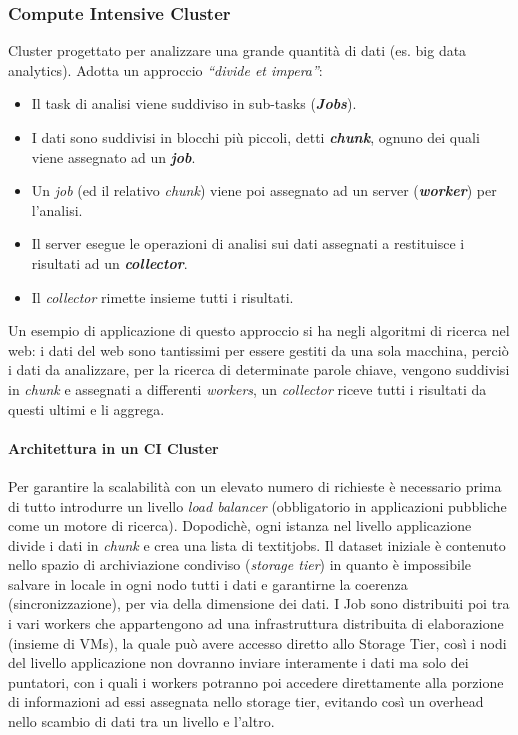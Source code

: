 \documentclass{article}
\begin{document}
\subsubsection{Compute Intensive Cluster}
Cluster progettato per analizzare una grande quantità di dati (es. big data analytics). 
Adotta un approccio \textit{“divide et impera”}:
\begin{itemize}
    \item Il task di analisi viene suddiviso in sub-tasks (\textit{\textbf{Jobs}}).
    \item I dati sono suddivisi in blocchi più piccoli, detti \textit{\textbf{chunk}}, ognuno dei quali viene assegnato ad un \textit{\textbf{job}}.
    \item Un \textit{job} (ed il relativo \textit{chunk}) viene poi assegnato ad un server (\textit{\textbf{worker}}) per l’analisi.
    \item Il server esegue le operazioni di analisi sui dati assegnati a restituisce i risultati ad un \textit{\textbf{collector}}.
    \item Il \textit{collector} rimette insieme tutti i risultati.
\end{itemize}
Un esempio di applicazione di questo approccio si ha negli algoritmi di ricerca nel web: i dati del web sono tantissimi per essere gestiti da una sola macchina, perciò i dati da analizzare, per la ricerca di determinate parole chiave, vengono suddivisi in \textit{chunk} e assegnati a differenti \textit{workers}, un \textit{collector} riceve tutti i risultati da questi ultimi e li aggrega.
\paragraph{Architettura in un CI Cluster}
Per garantire la scalabilità con un elevato numero di richieste è necessario prima di tutto introdurre un livello \textit{load balancer} (obbligatorio in applicazioni pubbliche come un motore di ricerca). Dopodichè, ogni istanza nel livello applicazione divide i dati in \textit{chunk} e crea una lista di textit{jobs}. Il dataset iniziale è contenuto nello spazio di archiviazione condiviso (\textit{storage tier}) in quanto è impossibile salvare in locale in ogni nodo tutti i dati e garantirne la coerenza (sincronizzazione), per via della dimensione dei dati. I Job sono distribuiti poi tra i vari workers che appartengono ad una infrastruttura distribuita di elaborazione (insieme di VMs), la quale può avere accesso diretto allo Storage Tier, così i nodi del livello applicazione non dovranno inviare interamente i dati ma solo dei puntatori, con i quali i workers potranno poi accedere direttamente alla porzione di informazioni ad essi assegnata nello storage tier, evitando così un overhead nello scambio di dati tra un livello e l'altro.
\end{document}
